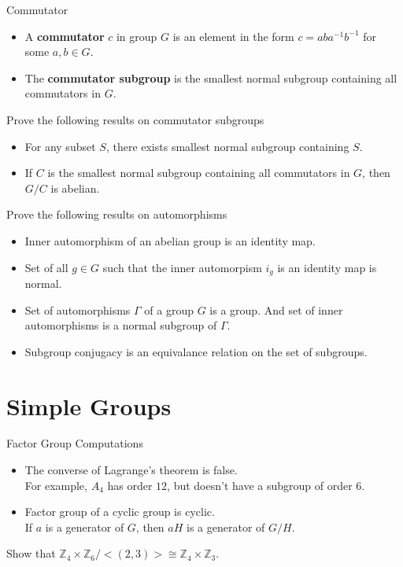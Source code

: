 \begin{definition}Commutator
	\begin{itemize}
		\item A \textbf{commutator} $c$ in group $G$ is an element in the form $c = aba^{-1}b^{-1}$ for some $a,b \in G$.
		\item The \textbf{commutator subgroup} is the smallest normal subgroup containing all commutators in $G$.
	\end{itemize}
\end{definition}

\begin{remark}Prove the following results on commutator subgroups 
	\begin{itemize}
		\item For any subset $S$, there exists smallest normal subgroup containing $S$. %
		\item If $C$ is the smallest normal subgroup containing all commutators in $G$, then $G/C$ is abelian.%
	\end{itemize}
\end{remark}

\begin{remark}Prove the following results on automorphisms 
	\begin{itemize}
		\item Inner automorphism of an abelian group is an identity map.%
		\item Set of all $g \in G$ such that the inner automorpism $i_g$ is an identity map is normal. %
		\item Set of automorphisms $\Gamma$ of a group $G$ is a group. And set of inner automorphisms is a normal subgroup of $\Gamma$.
		\item Subgroup conjugacy is an equivalance relation on the set of subgroups. %
	\end{itemize}
\end{remark}
\pagebreak

\section{Simple Groups}
\begin{remark}Factor Group Computations
	\begin{itemize}
		\item The converse of Lagrange's theorem is false.\\
			For example, $A_4$ has order $12$, but doesn't have a subgroup of order $6$.
		\item Factor group of a cyclic group is cyclic.\\
			If $a$ is a generator of $G$, then $aH$ is a generator of $G/H$.
	\end{itemize}
\end{remark}
\begin{question}
	Show that $\mathbb{Z}_4 \times \mathbb{Z}_6 / <(2,3)> \cong \mathbb{Z}_4 \times \mathbb{Z}_3$.
\end{question}

